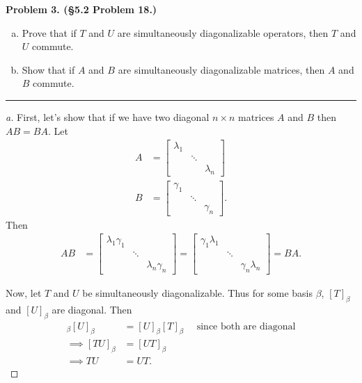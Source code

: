 \documentclass[leqno]{article}
\theoremstyle{nonumberplain}
\newtheorem{proof}{Proof}
\begin{document}
\pagebreak




\noindent\textbf{Problem 3. (\S 5.2 Problem 18.)} 
\begin{enumerate}[(a)]
\item Prove that if $T$ and $U$ are simultaneously diagonalizable operators, then $T$ and $U$ commute.
\item Show that if $A$ and $B$ are simultaneously diagonalizable matrices, then $A$ and $B$ commute.
\end{enumerate}

\noindent\rule[0.5ex]{\linewidth}{1pt}

\begin{proof}[a]
First, let's show that if we have two diagonal $n\times n$ matrices $A$ and $B$ then $AB=BA$.  Let 
\begin{align*}
A&= \begin{bmatrix}
\lambda_1 & & \\
& \ddots & \\
& & \lambda_n 
\end{bmatrix}\\
B&=
\begin{bmatrix}
\gamma_1 & & \\
& \ddots & \\
& & \gamma_n 
\end{bmatrix}.
\end{align*}
Then
\begin{align*}
AB&= 
\begin{bmatrix}
\lambda_1 \gamma_1 & & \\
& \ddots & \\
& & \lambda_n \gamma_n
\end{bmatrix}=
\begin{bmatrix}
\gamma_1 \lambda_1 & & \\
& \ddots & \\
& & \gamma_n \lambda_n 
\end{bmatrix}
=BA.
\end{align*}

Now, let $T$ and $U$ be simultaneously diagonalizable.  Thus for some basis $\beta$, $[T]_\beta$ and $[U]_\beta$ are diagonal.  Then
\begin{align*}
[T]_\beta [U]_\beta &= [U]_\beta [T]_\beta \textrm{~~~ since both are diagonal}\\
\implies [TU]_\beta &= [UT]_\beta\\
\implies TU&=UT.
\end{align*}
\end{proof}
\end{document}
